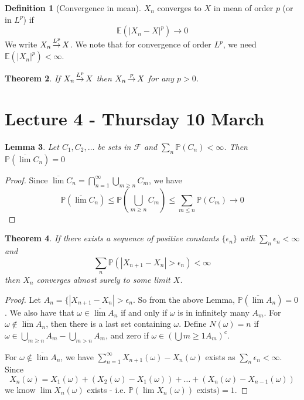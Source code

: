 \documentclass[10pt, oneside, reqno]{amsart}
\theoremstyle{plain}%
\newtheorem{thm}{Theorem}[section]
\newtheorem{lem}[thm]{Lemma}
\theoremstyle{definition}
\newtheorem{defn}[thm]{Definition}
\theoremstyle{remark}
\newcommand{\sigf}{\mathcal{F}}
\newcommand{\E}{\mathbb{E}}
\renewcommand{\P}{\mathbb{P}}
\def\cip{\,{\buildrel p \over \rightarrow}\,}
\def\clp{\,{\buildrel L^p \over \rightarrow}\,}
\begin{document}
\begin{defn}[Convergence in mean]
	$X_n$ converges to $X$ in mean of order $p$ (or in $L^p$) if\[
		\E(|X_n - X|^p) \rightarrow 0
	\]
	We write $X_n \clp X$.  We note that for convergence of order $L^p$, we need $\E(|X_n|^p) < \infty$.
\end{defn}

\begin{thm}
	If $X_n \clp X$ then $X_n \cip X$ for any $p > 0$.
\end{thm}

\section{Lecture 4 - Thursday 10 March} %
\label{sec:lecture_4_thursday_10_march}

\begin{lem}
	Let $C_1, C_2, \dots$ be sets in $\sigf$ and $\sum_n \P(C_n) < \infty$.  Then $\P(\overline{\lim} C_n) = 0$
\end{lem}
\begin{proof}
	Since $\overline{\lim} C_n = \bigcap_{n = 1}^\infty \bigcup_{m \geq n} C_m$, we have
	\[
		\P(\overline{\lim} C_n) \leq \P(\bigcup_{m \geq n} C_m) \leq \sum_{m \leq n} \P(C_m) \rightarrow 0 
	\]
\end{proof}

\begin{thm}\label{thm:4}
	If there exists a sequence of positive constants $ \{ \epsilon_n \}$ with $\sum_{n} \epsilon_n < \infty$ and \[
		\sum_{n} \P( |X_{n + 1} - X_n | > \epsilon_n) < \infty
	\] then $X_n$ converges almost surely to some limit $X$.
\end{thm}

\begin{proof}
	Let $A_n = \{ | X_{n+1} - X_n | > \epsilon_n$.  So from the above Lemma, $\P( \overline\lim A_n) = 0$.  We also have that $\omega \in \overline\lim A_n $ if and only if $\omega$ is in infinitely many $A_m$. For $\omega \notin \overline \lim A_n$, then there is a last set containing $\omega$.  Define $N(\omega) = n$ if $\omega \in \bigcup_{m \geq n} A_m - \bigcup_{m > n} A_m$, and zero if $\omega \in ( \bigcup{m \geq 1} A_m)^c$.
	
	For $\omega \notin \overline \lim A_n$, we have $\sum_{n = 1}^\infty X_{n+1}(\omega) - X_n(\omega)$ exists as $\sum_n \epsilon_n  < \infty$.  Since \[
		X_n(\omega) = X_1(\omega) + ( X_2(\omega) - X_1( \omega) ) + \dots + ( X_n( \omega) - X_{n-1}(\omega))
	\] we know $\lim X_n(\omega)$ exists - i.e. $\P( \lim X_n( \omega)) \text{ exists} ) = 1$.
\end{proof}
\end{document}
